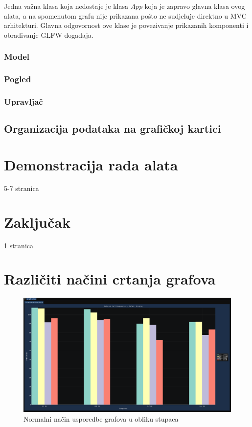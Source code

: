 \documentclass[times, utf8, diplomski]{fer}
\begin{document}
Jedna važna klasa koja nedostaje je klasa \textit{App} koja je zapravo glavna klasa ovog alata, a na spomenutom grafu nije prikazana pošto ne sudjeluje direktno u MVC arhitekturi. Glavna odgovornost ove klase je povezivanje prikazanih komponenti i obrađivanje GLFW događaja.

\subsection{Model}

\subsection{Pogled}

\subsection{Upravljač}

\section{Organizacija podataka na grafičkoj kartici} \label{graphics-card-data-section}

\chapter{Demonstracija rada alata}
5-7 stranica

\chapter{Zaključak}
1 stranica




\appendix
\chapter{Različiti načini crtanja grafova} \label{appendix:graph-display-examples}

\begin{figure}[H]
	\centering
	\includegraphics[width=\textwidth]{default_graph_display_bars.png}
	\caption{Normalni način usporedbe grafova u obliku stupaca}
    \label{appendix:default_graph_display_bars}
\end{figure}
\end{document}
